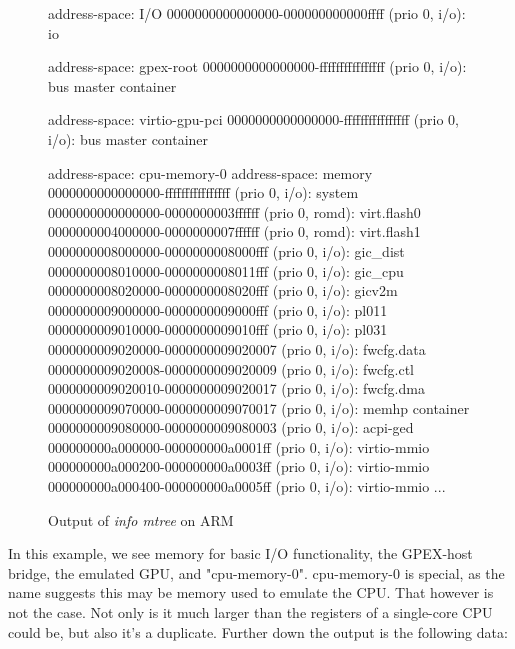 \begin{figure}[H]
\begin{ffcode}
    address-space: I/O
    0000000000000000-000000000000ffff (prio 0, i/o): io

  address-space: gpex-root
    0000000000000000-ffffffffffffffff (prio 0, i/o): bus master container

  address-space: virtio-gpu-pci
    0000000000000000-ffffffffffffffff (prio 0, i/o): bus master container

  address-space: cpu-memory-0
  address-space: memory
    0000000000000000-ffffffffffffffff (prio 0, i/o): system
      0000000000000000-0000000003ffffff (prio 0, romd): virt.flash0
      0000000004000000-0000000007ffffff (prio 0, romd): virt.flash1
      0000000008000000-0000000008000fff (prio 0, i/o): gic_dist
      0000000008010000-0000000008011fff (prio 0, i/o): gic_cpu
      0000000008020000-0000000008020fff (prio 0, i/o): gicv2m
      0000000009000000-0000000009000fff (prio 0, i/o): pl011
      0000000009010000-0000000009010fff (prio 0, i/o): pl031
      0000000009020000-0000000009020007 (prio 0, i/o): fwcfg.data
      0000000009020008-0000000009020009 (prio 0, i/o): fwcfg.ctl
      0000000009020010-0000000009020017 (prio 0, i/o): fwcfg.dma
      0000000009070000-0000000009070017 (prio 0, i/o): memhp container
      0000000009080000-0000000009080003 (prio 0, i/o): acpi-ged
      000000000a000000-000000000a0001ff (prio 0, i/o): virtio-mmio
      000000000a000200-000000000a0003ff (prio 0, i/o): virtio-mmio
      000000000a000400-000000000a0005ff (prio 0, i/o): virtio-mmio
      ...
\end{ffcode}
\caption{Output of \emph{info mtree} on ARM}
\label{fig:mem_ARM}
\end{figure}

In this example, we see memory for basic I/O functionality, the GPEX-host bridge, the emulated GPU, and "cpu-memory-0".
cpu-memory-0 is special, as the name suggests this may be memory used to emulate the CPU. That however is not the case.
Not only is it much larger than the registers of a single-core CPU could be, but also it's a duplicate.
Further down the output is the following data:

